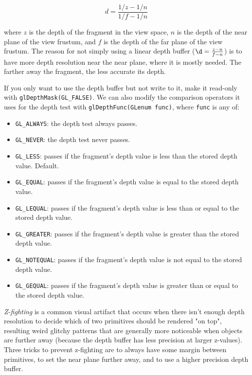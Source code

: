\documentclass[8pt, table, xcdraw]{article}%
\begin{document}
\begin{equation}
    d = \frac{1/z - 1/n}{1/f - 1/n}
\end{equation}

where $z$ is the depth of the fragment in the view space, $n$ is the depth of the near plane of the view frustum, and $f$ is the depth of the far plane of the view frustum. The reason for not simply using a linear depth buffer ($\d = \frac{z - n}{f - n}$) is to have more depth resolution near the near plane, where it is mostly needed. The farther away the fragment, the less accurate its depth.

If you only want to use the depth buffer but not write to it, make it read-only with \lstinline{glDepthMask(GL_FALSE)}. We can also modify the comparison operators it uses for the depth test with \lstinline{glDepthFunc(GLenum func)}, where \lstinline{func} is any of:

\begin{itemize}
    \item \lstinline{GL_ALWAYS}: the depth test always passes.
    \item \lstinline{GL_NEVER}: the depth test never passes.
    \item \lstinline{GL_LESS}: passes if the fragment's depth value is less than the stored depth value. Default.
    \item \lstinline{GL_EQUAL}: passes if the fragment's depth value is equal to the stored depth value.
    \item \lstinline{GL_LEQUAL}: passes if the fragment's depth value is less than or equal to the stored depth value.
    \item \lstinline{GL_GREATER}: passes if the fragment's depth value is greater than the stored depth value.
    \item \lstinline{GL_NOTEQUAL}: passes if the fragment's depth value is not equal to the stored depth value.
    \item \lstinline{GL_GEQUAL}: passes if the fragment's depth value is greater than or equal to the stored depth value.
\end{itemize}

\emph{Z-fighting} is a common visual artifact that occurs when there isn't enough depth resolution to decide which of two primitives should be rendered "on top", resulting weird glitchy patterns that are generally more noticeable when objects are further away (because the depth buffer has less precision at larger z-values). Three tricks to prevent z-fighting are to always have some margin between primitives, to set the near plane further away, and to use a higher precision depth buffer.
\end{document}
